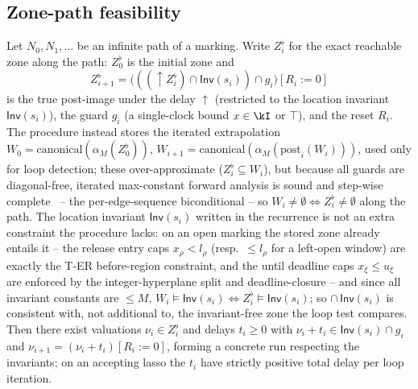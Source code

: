 \subsection{Zone-path feasibility}
\begin{lemma}\label{lem:feasible}
Let $N_0,N_1,\dots$ be an infinite path of a marking. Write $Z_i^{\flat}$ for the {exact} reachable zone along the path: $Z_0^{\flat}$ is the initial zone and
\[
Z_{i+1}^{\flat}=\big(((\uparrow Z_i^{\flat})\cap\mathsf{Inv}(s_i))\cap g_i\big)[R_i:=0]
\]
is the true post-image under the delay $\uparrow$ (restricted to the location invariant $\mathsf{Inv}(s_i)$), the guard $g_i$ (a single-clock bound $x\in\kI$ or $\top$), and the reset $R_i$. The procedure instead stores the {iterated extrapolation} $W_0=\mathrm{canonical}(\alpha_M(Z_0^{\flat}))$, $W_{i+1}=\mathrm{canonical}(\alpha_M(\mathrm{post}_i(W_i)))$, used only for loop detection; these over-approximate ($Z_i^{\flat}\subseteq W_i$), but because all guards are diagonal-free, iterated max-constant forward analysis is sound and {step-wise complete}~\cite{Bouyer05TimedAutomata} -- the per-edge-sequence biconditional -- so $W_i\neq\emptyset \iff Z_i^{\flat}\neq\emptyset$ along the path. The location invariant $\mathsf{Inv}(s_i)$ written in the recurrence is not an extra constraint the procedure lacks: on an open marking the stored zone already entails it -- the release entry caps $x_\rho<l_\rho$ (resp.\ $\le l_\rho$ for a left-open window) are exactly the T-ER before-region constraint, and the until deadline caps $x_\xi\le u_\xi$ are enforced by the integer-hyperplane split and deadline-closure -- and since all invariant constants are $\le M$, $W_i\models\mathsf{Inv}(s_i)\iff Z_i^{\flat}\models\mathsf{Inv}(s_i)$; so $\cap\,\mathsf{Inv}(s_i)$ is consistent with, not additional to, the invariant-free zone the loop test compares. Then there exist valuations $\nu_i\in Z_i^{\flat}$ and delays $t_i\ge 0$ with $\nu_i+t_i\in\mathsf{Inv}(s_i)\cap g_i$ and $\nu_{i+1}=(\nu_i+t_i)[R_i:=0]$, forming a concrete run respecting the invariants; on an accepting lasso the $t_i$ have strictly positive total delay per loop iteration.
\end{lemma}
